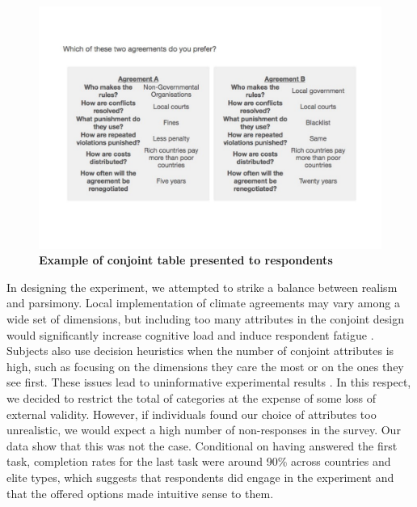 \documentclass[a4paper,12pt]{article}
\begin{document}
\begin{figure}[H]
	\centering
	\includegraphics[width=15cm]{conjoint-cropped.pdf}
	\caption{\textbf{Example of conjoint table presented to respondents}}
	\label{fig:conjoint}
\end{figure}

In designing the experiment, we attempted to strike a balance between realism and parsimony. Local implementation of climate agreements may vary among a wide set of dimensions, but including too many attributes in the conjoint design would significantly increase cognitive load and induce respondent fatigue \citep{pullman1999comparison}. Subjects also use decision heuristics when the number of conjoint attributes is high, such as focusing on the dimensions they care the most or on the ones they see first. These issues lead to uninformative experimental results \citep{lines2004information}. In this respect, we decided to restrict the total of categories at the expense of some loss of external validity. However, if individuals found our choice of attributes too unrealistic, we would expect a high number of non-responses in the survey. Our data show that this was not the case. Conditional on having answered the first task, completion rates for the last task were around 90\% across countries and elite types, which suggests that respondents did engage in the experiment and that the offered options made intuitive sense to them.
\end{document}
